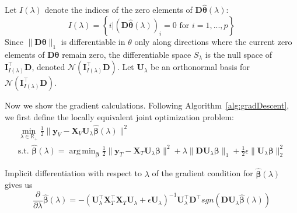 \documentclass[12pt,letterpaper]{article}
\DeclareMathOperator*{\argmin}{arg\,min}
\begin{document}
Let $I(\lambda)$ denote the indices of the zero elements of $\boldsymbol D \hat{\boldsymbol{\theta}}(\lambda)$:
\begin{equation}
I(\lambda) = \left \{i | (\boldsymbol D \hat{\boldsymbol{\theta}}(\lambda))_i = 0  \text{ for } i=1,...,p \right \}
\end{equation}
Since $\|\boldsymbol D \boldsymbol{\theta}\|_1$ is differentiable in $\theta$ only along directions where the current zero elements of $\boldsymbol D \boldsymbol{\theta}$ remain zero, the differentiable space $S_\lambda$ is the null space of $\boldsymbol I_{I(\lambda)}^\top \boldsymbol D$, denoted $\mathcal{N}(\boldsymbol I_{I(\lambda)}^\top \boldsymbol D)$. Let $\boldsymbol U_\lambda$ be an orthonormal basis for $\mathcal{N}(\boldsymbol I_{I(\lambda)}^\top \boldsymbol D)$.

Now we show the gradient calculations. Following Algorithm~\ref{alg:gradDescent}, we first define the locally equivalent joint optimization problem:
\begin{equation}
\begin{array}{c}
\min_{\lambda \in \mathbb{R}_{+}} \frac{1}{2} \| \boldsymbol{y}_V - \boldsymbol{X}_V \boldsymbol U_\lambda \hat{\boldsymbol{\beta}} (\lambda) \| ^2 \\
\text{s.t. }
\hat{\boldsymbol{\beta}} (\lambda) =
\argmin_{\boldsymbol{\beta}}
\frac{1}{2} \| \boldsymbol{y}_T - \boldsymbol{X}_T \boldsymbol U_\lambda \boldsymbol{\beta} \| ^2
+ \lambda \| \boldsymbol D \boldsymbol U_\lambda \boldsymbol{\beta} \|_1
+ \frac{1}{2} \epsilon \| \boldsymbol U_\lambda \boldsymbol{\beta} \|_2^2
\end{array}
\label{genlassoeasy}
\end{equation}


Implicit differentiation with respect to $\lambda$ of the gradient condition for $\hat{\boldsymbol \beta}(\lambda)$ gives us
\begin{equation}
\frac{\partial}{\partial \lambda} \hat{\boldsymbol \beta}(\lambda) =
-(\boldsymbol U_\lambda^\top \boldsymbol X_T^\top \boldsymbol X_T \boldsymbol U_\lambda  + \epsilon \boldsymbol U_\lambda)^{-1}
\boldsymbol U_\lambda^\top \boldsymbol D^\top sgn(\boldsymbol D \boldsymbol U_\lambda \hat{\boldsymbol \beta}(\lambda))
\label{genlassoParamDeriv}
\end{equation}
\end{document}
